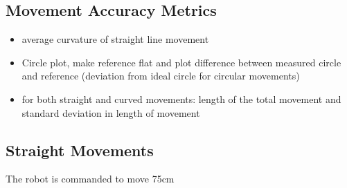 \subsection{Movement Accuracy Metrics}

\begin{itemize}
	\item average curvature of straight line movement
	\item Circle plot, make reference flat and plot difference between measured circle and reference (deviation from ideal circle for circular movements)
	\item for both straight and curved movements: length of the total movement and  standard deviation in length of movement
\end{itemize}


\subsection{Straight Movements}

The robot is commanded to move 75cm

